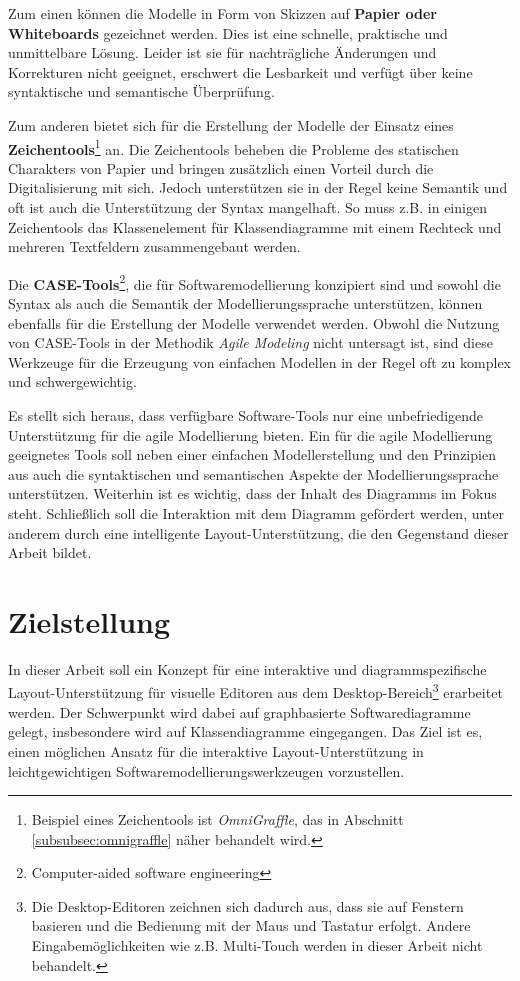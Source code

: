 Zum einen können die Modelle in Form von Skizzen auf \textbf{Papier oder Whiteboards} gezeichnet werden. Dies ist eine schnelle, praktische und unmittelbare Lösung. Leider ist sie für nachträgliche Änderungen und Korrekturen nicht geeignet, erschwert die Lesbarkeit und verfügt über keine syntaktische und semantische Überprüfung.

Zum anderen bietet sich für die Erstellung der Modelle der Einsatz eines \textbf{Zeichentools}\footnote{Beispiel eines Zeichentools ist \textit{OmniGraffle}, das in Abschnitt \ref{subsubsec:omnigraffle} näher behandelt wird.} an. Die Zeichentools beheben die Probleme des statischen Charakters von Papier und bringen zusätzlich einen Vorteil durch die Digitalisierung mit sich. Jedoch unterstützen sie in der Regel keine Semantik und oft ist auch die Unterstützung der Syntax mangelhaft. So muss z.B. in einigen Zeichentools das Klassenelement für Klassendiagramme mit einem Rechteck und mehreren Textfeldern zusammengebaut werden.

Die \textbf{CASE-Tools}\footnote{Computer-aided software engineering}, die für Softwaremodellierung konzipiert sind und sowohl die Syntax als auch die Semantik der Modellierungssprache unterstützen, können ebenfalls für die Erstellung der Modelle verwendet werden. Obwohl die Nutzung von CASE-Tools in der Methodik \textit{Agile Modeling} nicht untersagt ist, sind diese Werkzeuge für die Erzeugung von einfachen Modellen in der Regel oft zu komplex und schwergewichtig.

Es stellt sich heraus, dass verfügbare Software-Tools nur eine unbefriedigende Unterstützung für die agile Modellierung bieten. Ein für die agile Modellierung geeignetes Tools soll neben einer einfachen Modellerstellung und den Prinzipien aus \cite{Ambler02Agile} auch die syntaktischen und semantischen Aspekte der Modellierungssprache unterstützen. Weiterhin ist es wichtig, dass der Inhalt des Diagramms im Fokus steht. Schließlich soll die Interaktion mit dem Diagramm gefördert werden, unter anderem durch eine intelligente Layout-Unterstützung, die den Gegenstand dieser Arbeit bildet.

\section{Zielstellung}

In dieser Arbeit soll ein Konzept für eine interaktive und diagrammspezifische Layout-Un\-ter\-stüt\-zung für visuelle Editoren aus dem Desktop-Bereich\footnote{Die Desktop-Editoren zeichnen sich dadurch aus, dass sie auf Fenstern basieren und die Bedienung mit der Maus und Tastatur erfolgt. Andere Eingabemöglichkeiten wie z.B. Multi-Touch werden in dieser Arbeit nicht behandelt.} erarbeitet werden. Der Schwerpunkt wird dabei auf graphbasierte Softwarediagramme gelegt, insbesondere wird auf Klassendiagramme eingegangen. Das Ziel ist es, einen möglichen Ansatz für die interaktive Layout-Unterstützung in leichtgewichtigen Softwaremodellierungswerkzeugen vorzustellen.

